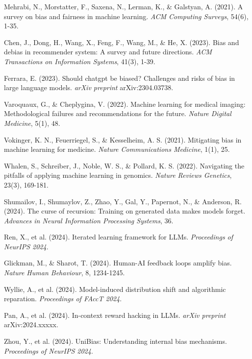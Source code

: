 \documentclass[11pt,a4paper]{article}
\begin{document}
\begin{thebibliography}{99}

Mehrabi, N., Morstatter, F., Saxena, N., Lerman, K., \& Galstyan, A. (2021). A survey on bias and fairness in machine learning. \textit{ACM Computing Surveys}, 54(6), 1-35.

Chen, J., Dong, H., Wang, X., Feng, F., Wang, M., \& He, X. (2023). Bias and debias in recommender system: A survey and future directions. \textit{ACM Transactions on Information Systems}, 41(3), 1-39.

Ferrara, E. (2023). Should chatgpt be biased? Challenges and risks of bias in large language models. \textit{arXiv preprint} arXiv:2304.03738.

Varoquaux, G., \& Cheplygina, V. (2022). Machine learning for medical imaging: Methodological failures and recommendations for the future. \textit{Nature Digital Medicine}, 5(1), 48.

Vokinger, K. N., Feuerriegel, S., \& Kesselheim, A. S. (2021). Mitigating bias in machine learning for medicine. \textit{Nature Communications Medicine}, 1(1), 25.

Whalen, S., Schreiber, J., Noble, W. S., \& Pollard, K. S. (2022). Navigating the pitfalls of applying machine learning in genomics. \textit{Nature Reviews Genetics}, 23(3), 169-181.

Shumailov, I., Shumaylov, Z., Zhao, Y., Gal, Y., Papernot, N., \& Anderson, R. (2024). The curse of recursion: Training on generated data makes models forget. \textit{Advances in Neural Information Processing Systems}, 36.

Ren, X., et al. (2024). Iterated learning framework for LLMs. \textit{Proceedings of NeurIPS 2024}.

Glickman, M., \& Sharot, T. (2024). Human-AI feedback loops amplify bias. \textit{Nature Human Behaviour}, 8, 1234-1245.

Wyllie, A., et al. (2024). Model-induced distribution shift and algorithmic reparation. \textit{Proceedings of FAccT 2024}.

Pan, A., et al. (2024). In-context reward hacking in LLMs. \textit{arXiv preprint} arXiv:2024.xxxxx.

Zhou, Y., et al. (2024). UniBias: Understanding internal bias mechanisms. \textit{Proceedings of NeurIPS 2024}.


\end{thebibliography}
\end{document}
